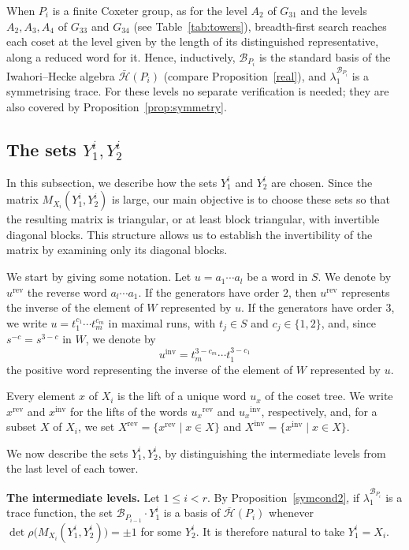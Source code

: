 \documentclass[11pt, reqno]{amsart}
\newcommand{\cB}{\mathcal{B}}
\newcommand{\cH}{\mathcal{H}}
\newcommand{\wrev}[1]{{#1}^{\mathrm{rev}}}
\newcommand{\winv}[1]{{#1}^{\mathrm{inv}}}
\numberwithin{equation}{section}
\theoremstyle{remark}
\begin{document}
When $P_i$ is a finite Coxeter group, as for the level $A_2$ of $G_{31}$ and the levels $A_2,A_3,A_4$ of $G_{33}$ and $G_{34}$ (see Table~\ref{tab:towers}), breadth-first search reaches
each coset at the level given by the length of its distinguished
representative, along a reduced word for it. Hence, inductively,
$\cB_{P_i}$ is the standard basis of the Iwahori--Hecke algebra
$\bar{\cH}(P_i)$ (compare Proposition~\ref{real}), and
$\lambda_1^{\cB_{P_i}}$ is a symmetrising trace. For these
levels no separate verification is needed; they are also covered by Proposition~\ref{prop:symmetry}.

\subsection{The sets $Y^i_1,Y^i_2$}\label{subsec:Y} In this subsection, we describe how the sets $Y_1^i$ and $Y_2^i$ are chosen.
Since the matrix $M_{X_i}(Y_1^i,Y_2^i)$ is large, our main objective is
to choose these sets so that the resulting matrix is triangular, or at
least block triangular, with invertible diagonal blocks. This structure
allows us to establish the invertibility of the matrix by examining
only its diagonal blocks.

We start by giving some notation.
Let $u=a_1\cdots a_l$ be a word in $S$. We denote by $\wrev u$ the reverse word $a_l\cdots a_1$. If the generators have order $2$, then $\wrev u$ represents the inverse of the element of $W$ represented by $u$. If the generators have order $3$, we write $u=t_1^{c_1}\cdots t_m^{c_m}$ in maximal runs, with $t_j\in S$ and $c_j\in\{1,2\}$, and, since $s^{-c}=s^{3-c}$ in $W$, we denote by
\[
\winv u=t_m^{3-c_m}\cdots t_1^{3-c_1}
\]
the positive word representing the inverse of the element of $W$ represented by $u$.

Every element $x$ of $X_i$ is the lift of a unique word $u_x$ of the coset tree. We write $\wrev x$ and $\winv x$ for the lifts of the words $\wrev{u_x}$ and $\winv{u_x}$, respectively, and, for a subset $X$ of $X_i$, we set $\wrev X=\{\wrev x\mid x\in X\}$ and $\winv X=\{\winv x\mid x\in X\}$.

We now describe the sets $Y^i_1,Y^i_2$, by distinguishing the intermediate levels from the last level of each tower.

\medskip\noindent\textbf{The intermediate levels.} Let $1\le i<r$. By Proposition~\ref{symcond2}, if $\lambda_1^{\cB_{P_i}}$ is a
trace function, the set $\cB_{P_{i-1}}\cdot Y_1^i$ is a basis of
$\bar{\cH}(P_i)$ whenever
$\det\rho\big(M_{X_i}(Y_1^i,Y_2^i)\big)=\pm1$ for some $Y_2^i$. It is therefore natural to take $Y^i_1=X_i$.
\end{document}
